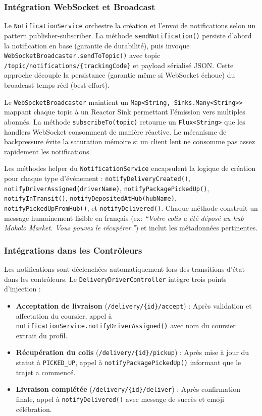 \subsubsection{Intégration WebSocket et Broadcast}

Le \texttt{NotificationService} orchestre la création et l'envoi de notifications selon un pattern publisher-subscriber. La méthode \texttt{sendNotification()} persiste d'abord la notification en base (garantie de durabilité), puis invoque \texttt{WebSocketBroadcaster.sendToTopic()} avec topic \texttt{/topic/notifications/\{trackingCode\}} et payload sérialisé JSON. Cette approche découple la persistance (garantie même si WebSocket échoue) du broadcast temps réel (best-effort).

Le \texttt{WebSocketBroadcaster} maintient un \texttt{Map\textless String, Sinks.Many\textless String\textgreater\textgreater} mappant chaque topic à un Reactor Sink permettant l'émission vers multiples abonnés. La méthode \texttt{subscribeTo(topic)} retourne un \texttt{Flux\textless String\textgreater} que les handlers WebSocket consomment de manière réactive. Le mécanisme de backpressure évite la saturation mémoire si un client lent ne consomme pas assez rapidement les notifications.

Les méthodes helper du \texttt{NotificationService} encapsulent la logique de création pour chaque type d'événement : \texttt{notifyDeliveryCreated()}, \texttt{notifyDriverAssigned(driverName)}, \texttt{notifyPackagePickedUp()}, \texttt{notifyInTransit()}, \texttt{notifyDepositedAtHub(hubName)}, \texttt{notifyPickedUpFromHub()}, et \texttt{notifyDelivered()}. Chaque méthode construit un message humainement lisible en français (ex: \textit{``Votre colis a été déposé au hub Mokolo Market. Vous pouvez le récupérer.''}) et inclut les métadonnées pertinentes.

\subsubsection{Intégrations dans les Contrôleurs}

Les notifications sont déclenchées automatiquement lors des transitions d'état dans les contrôleurs. Le \texttt{DeliveryDriverController} intègre trois points d'injection :

\begin{itemize}
    \item \textbf{Acceptation de livraison} (\texttt{/delivery/\{id\}/accept}) : Après validation et affectation du coursier, appel à \texttt{notificationService.notifyDriverAssigned()} avec nom du coursier extrait du profil.
    \item \textbf{Récupération du colis} (\texttt{/delivery/\{id\}/pickup}) : Après mise à jour du statut à \texttt{PICKED\_UP}, appel à \texttt{notifyPackagePickedUp()} informant que le trajet a commencé.
    \item \textbf{Livraison complétée} (\texttt{/delivery/\{id\}/deliver}) : Après confirmation finale, appel à \texttt{notifyDelivered()} avec message de succès et emoji célébration.
\end{itemize}

